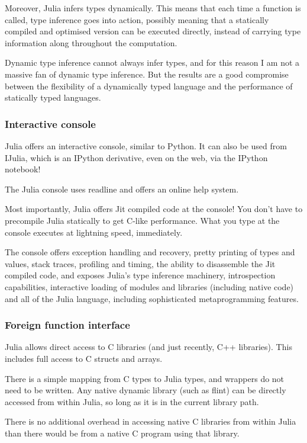 \documentclass[a4paper,10pt]{article}
\begin{document}
Moreover, Julia infers types dynamically. This means that each time a function is called, type
inference goes into action, possibly meaning that a statically compiled and optimised version
can be executed directly, instead of carrying type information along throughout the 
computation.

Dynamic type inference cannot always infer types, and for this reason I am not a massive fan of
dynamic type inference. But the results are a good compromise between the flexibility of a 
dynamically typed language and the performance of statically typed languages.

\subsubsection{Interactive console}

Julia offers an interactive console, similar to Python. It can also be used from IJulia, which
is an IPython derivative, even on the web, via the IPython notebook!

The Julia console uses readline and offers an online help system.

Most importantly, Julia offers Jit compiled code at the console! You don't have to precompile
Julia statically to get C-like performance. What you type at the console executes at lightning
speed, immediately.

The console offers exception handling and recovery, pretty printing of types and values, stack 
traces, profiling and timing, the ability to disassemble the Jit compiled code, and exposes 
Julia's type inference machinery, introspection capabilities, interactive loading of modules 
and libraries (including native code) and all of the Julia language, including sophisticated 
metaprogramming features. 

\subsubsection{Foreign function interface}

Julia allows direct access to C libraries (and just recently, C++ libraries). This includes
full access to C structs and arrays.

There is a simple mapping from C types to Julia types, and wrappers do not need to be written.
Any native dynamic library (such as flint) can be directly accessed from within Julia, so long
as it is in the current library path.

There is no additional overhead in accessing native C libraries from within Julia than there
would be from a native C program using that library.
\end{document}
